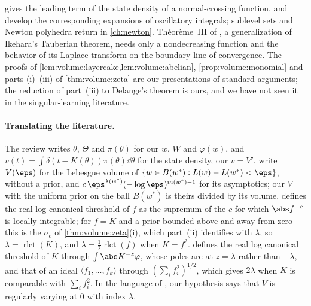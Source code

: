 \begin{refsection}
\Textcite[Lemma~4]{Watanabe2013} gives the leading term of the state density of a normal-crossing function, and \textcite[pp.~215--262]{ArnoldEtAl1988} develop the corresponding expansions of oscillatory integrals; sublevel sets and Newton polyhedra return in \cref{ch:newton}. Th\'eor\`eme~III of \textcite{Delange1954}, a generalization of Ikehara's Tauberian theorem, needs only a nondecreasing function and the behavior of its Laplace transform on the boundary line of convergence. The proofs of \cref{lem:volume:layercake,lem:volume:abelian}, \cref{prop:volume:monomial} and parts (i)--(iii) of \cref{thm:volume:zeta} are our presentations of standard arguments; the reduction of part~(iii) to Delange's theorem is ours, and we have not seen it in the singular-learning literature.

\paragraph{Translating the literature.} The review \parencite{Watanabe2024} writes $\theta$, $\Theta$ and $\pi(\theta)$ for our $w$, $W$ and $\varphi(w)$, and $v(t)=\int\delta(t-K(\theta))\pi(\theta)\dd\theta$ for the state density, our $v=V'$. \Textcite{LauEtAl2025} write $V(\eps)$ for the Lebesgue volume of $\{w\in B(w^*):L(w)-L(w^*)<\eps\}$, without a prior, and $c\,\eps^{\lambda(w^*)}(-\log\eps)^{m(w^*)-1}$ for its asymptotics; our $V$ with the uniform prior on the ball $B(w^*)$ is theirs divided by its volume. \Textcite{Saito2007} defines the real log canonical threshold of $f$ as the supremum of the $c$ for which $\abs f^{-c}$ is locally integrable; for $f=K$ and a prior bounded above and away from zero this is the $\sigma_c$ of \cref{thm:volume:zeta}(i), which part~(ii) identifies with $\lambda$, so $\lambda=\operatorname{rlct}(K)$, and $\lambda=\frac12\operatorname{rlct}(f)$ when $K=f^2$. \Textcite{Lin2011} defines the real log canonical threshold of $K$ through $\int\abs K^{-z}\varphi$, whose poles are at $z=\lambda$ rather than $-\lambda$, and that of an ideal $\langle f_1,\dots,f_k\rangle$ through $(\sum_if_i^2)^{1/2}$, which gives $2\lambda$ when $K$ is comparable with $\sum_if_i^2$. In the language of \textcite{BinghamEtAl1987}, our hypothesis says that $V$ is regularly varying at $0$ with index $\lambda$.

\printchapterbib
\end{refsection}
